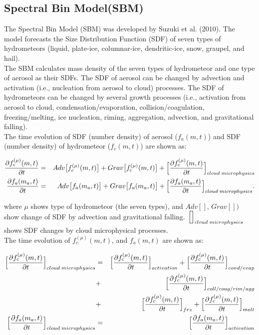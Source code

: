 \subsection{Spectral Bin Model(SBM)\cite{suzuki_etal_2010}}
The Spectral Bin Model (SBM) was developed by Suzuki et al. (2010)\cite{suzuki_etal_2010}. The model forecasts the Size Distribution Function (SDF) of seven types of hydrometeors (liquid, plate-ice, columnar-ice, dendritic-ice, snow, graupel, and hail). \\
The SBM calculates mass density of the seven types of hydrometeor and one type of aerosol as their SDFs. The SDF of aerosol can be changed by advection and activation (i.e., nucleation from aerosol to cloud) processes. The SDF of hydrometeors can be changed by several growth processes (i.e., activation from aerosol to cloud, condensation/evaporation, collision/coagulation, freezing/melting, ice nucleation, riming, aggregation, advection, and gravitational falling). \\
The time evolution of SDF (number density) of aerosol ($f_{a}(m,t)$) and SDF (number density) of hydrometeor ($f_{c}(m,t)$) are shown as:

\begin{eqnarray}
\frac{\partial f^{(\mu)}_{c}(m,t)}{\partial t}&=&Adv\bigl[f^{(\mu)}_{c}(m,t)\bigr]+Grav\bigl[f^{(\mu)}_{c}(m,t)\bigr]+\Bigl[ \frac{\partial f^{(\mu)}_{c}(m,t)}{\partial t}\Bigr ]_{cloud\;microphysics}\label{s10-1}\\
\frac{\partial f_{a}(m_{a},t)}{\partial t}&=&Adv\bigl[f_{a}(m_{a},t)\bigr]+Grav\bigl[f_{a}(m_{a},t)\bigr]+\Bigl[ \frac{\partial f_{a}(m_{a},t)}{\partial t} \Bigr ]_{cloud\;microphysics}.\label{s10-2}
\end{eqnarray}

where $\mu$ shows type of hydrometeor (the seven types), and $Adv[]$, $Grav[])$ show change of SDF by  advection and gravitational falling. $\Bigl[ \Bigr]_{cloud\;microphysics}$ shows SDF changes by cloud microphysical processes.\\
The time evolution of $f_{c}^{(\mu)}(m,t)$, and $f_{a}(m,t)$ are shown as:

\begin{eqnarray}
\Bigl[ \frac{\partial f_{c}^{(\mu)}(m,t)}{\partial t}\Bigl]_{cloud\;microphysics}&=&\Bigl[\frac{\partial f_{c}^{(\mu)}(m,t)}{\partial t}\Bigr]_{activation}+\Bigl[\frac{\partial f_{c}^{(\mu)}(m,t)}{\partial t}\Bigr]_{cond/evap}\nonumber\\
&+&\Bigl[\frac{\partial f_{c}^{(\mu)}(m,t)}{\partial t}\Bigr]_{coll/coag/rim/agg}\nonumber\\
&+&\Bigl[\frac{\partial f_{c}^{(\mu)}(m,t)}{\partial t}\Bigr]_{frz}+\Bigl[\frac{\partial f_{c}^{(\mu)}(m,t)}{\partial t}\Bigr]_{melt}\nonumber\\
\Bigl[ \frac{\partial f_{a}(m_{a},t)}{\partial t}\Bigl]_{cloud\;microphysics}&=&\Bigl[\frac{\partial f_{a}(m_{a},t)}{\partial t}\Bigr]_{activation}\nonumber
\end{eqnarray}

